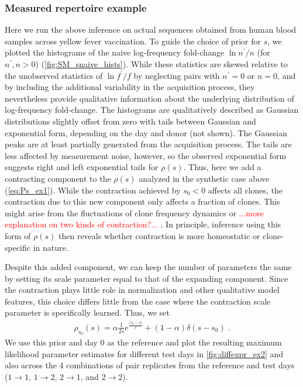 \documentclass[letterpaper,english,prl,reprint,longbibliography]{revtex4-1} %
\newcommand{\re}[1]{\textcolor{red}{#1}}
\begin{document}
\subsubsection*{Measured repertoire example}
Here we run the above inference on actual sequences obtained from human blood samples across yellow fever vaccination. To guide the choice of prior for $s$, we plotted the histograms of the naive log-frequency fold-change $\ln n^{\prime}/n$ (for $n^{\prime},n>0$) (\cref{fig:SM_snaive_hists}). While these statistics are skewed relative to the unobserved statistics of $\ln f^{\prime}/f$ by neglecting pairs with $n^{\prime}=0$ or $n=0$, and by including the additional variability in the acquisition process, they nevertheless provide qualitative information about the underlying distribution of log-frequency fold-change. The histograms are qualitatively described as Gaussian distributions slightly offset from zero with tails between Gaussian and exponential form, depending on the day and donor (not shown). The Gaussian peaks are at least partially generated from the acquisition process. The tails are less affected by measurement noise, however, so the observed exponential form suggests right and left exponential tails for $\rho(s)$. Thus, here we add a contracting component to the $\rho(s)$ analyzed in the synthetic case above (\cref{eq:Ps_ex1}). While the contraction achieved by $s_0<0$ affects all clones, the contraction due to this new component only affects a fraction of clones. This might arise from the fluctuations of clone frequency dynamics or \re{ ...more explanation on two kinds of contraction?...} . In principle, inference using this form of $\rho(s)$ then reveals whether contraction is more homeostatic or clone-specific in nature.

Despite this added component, we can keep the number of parameters the same by setting its scale parameter equal to that of the expanding component. Since the contraction plays little role in normalization and other qualitative model features, this choice differs little from the case where the contraction scale parameter is specifically learned.  Thus, we set
\begin{align}
	\rho_{s_0}(s)=\alpha\frac{1}{2\bar{s}}e^{\frac{|s_0-s|}{\bar{s}}}+(1-\alpha)\delta(s-s_0)\;. \label{eq:Ps_ex2}
\end{align} 
We use this prior and day 0 as the reference and plot the resulting maximum likelihood parameter estimates for different test days in \cref{fig:diffexpr_ex2} and also across the 4 combinations of pair replicates from the reference and test days ($1\rightarrow 1	$, $1\rightarrow 2$, $2\rightarrow 1$, and $2\rightarrow 2$). 
\end{document}
